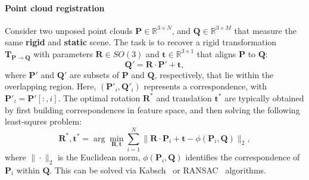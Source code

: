 \paragraph{Point cloud registration}
Consider two unposed point clouds $\mathbf{P} \in \mathbb{R}^{3 \times N} $, and $\mathbf{Q} \in \mathbb{R}^{3 \times M}$ that measure the same \textbf{rigid} and \textbf{static} scene. The task is to recover a rigid transformation $\mathbf{T}_{\mathbf{P} \rightarrow \mathbf{Q}}$ with parameters $\mathbf{R} \in SO(3)$ and $\mathbf{t} \in \mathbb{R}^{3 \times 1}$ that aligns %
$\mathbf{P}$ to $\mathbf{Q}$:
\begin{equation}
    \mathbf{Q}' = \mathbf{R} \cdot \mathbf{P}' + \mathbf{t},
\end{equation}
where $\mathbf{P}'$ and $\mathbf{Q}'$ are subsets of $\mathbf{P}$ and $\mathbf{Q}$, respectively, that lie within the overlapping region. Here, $(\mathbf{P}'_i, \mathbf{Q}'_i)$ represents a correspondence, with $\mathbf{P}'_i = \mathbf{P}'[:,i]$.  The optimal rotation $\mathbf{R}^*$ and translation $\mathbf{t}^*$ are typically obtained by first building correspondences in feature space, and then solving the following least-squres problem:
\begin{equation}
    \mathbf{R}^*, \mathbf{t}^* = \arg \min_{\mathbf{R}, \mathbf{t}} \sum_{i=1}^N \| \mathbf{R} \cdot \mathbf{P}_i + \mathbf{t} - \phi(\mathbf{P}_i, \mathbf{Q}) \|_2,
\end{equation}
where $\|\!\cdot\!\|_2$ is the Euclidean norm, $\phi(\mathbf{P}_i, \mathbf{Q})$ identifies the correspondence of $\mathbf{P}_i$ within $\mathbf{Q}$. This can be solved via Kabsch~\cite{kabsch1976solution} or RANSAC~\cite{ransac} algorithms.

